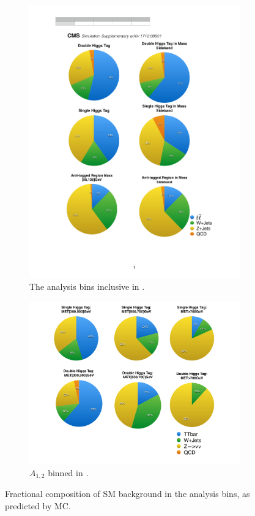 \begin{figure}
\begin{subfigure}[b]{0.42\textwidth}
\centering
\includegraphics[width=\textwidth]{figs/SUS17006/CMS-SUS-17-006_Figure-aux_003.pdf}
\caption{The analysis bins inclusive in \ptmiss.}
\end{subfigure}
\begin{subfigure}[b]{0.58\textwidth}
\centering
\includegraphics[width=\textwidth]{figs/SUS17006/PieChartBkgComp.pdf} 
\caption{$A_{1, 2}$ binned in \ptmiss.}
\end{subfigure}
\caption{Fractional composition of SM background in the analysis bins, as predicted by MC.}
\label{fig:composition}
\end{figure}


